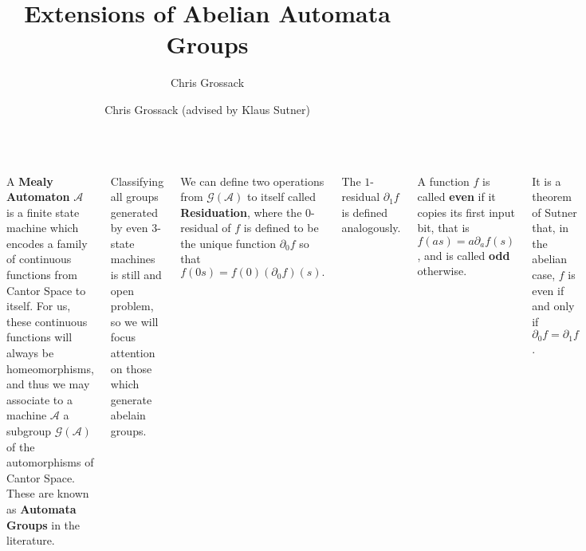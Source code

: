 \documentclass[24pt]{tikzposter}
\author{Chris Grossack}
\title{Extensions of Abelian Automata Groups}
\author{Chris Grossack (advised by Klaus Sutner)}
\institute{Carnegie Mellon University}
\theoremstyle{definition}
\newcommand{\Z}{\mathbb{Z}}
\newcommand{\del}{\partial}
\begin{document}
\maketitle

\begin{columns}
  {
    A \textbf{Mealy Automaton} $\mathcal{A}$ is a finite state 
    machine which encodes a family of continuous functions from 
    Cantor Space to itself. For us, these continuous functions 
    will always be homeomorphisms, and thus we may associate
    to a machine $\mathcal{A}$ a subgroup $\mathcal{G}(\mathcal{A})$
    of the automorphisms of Cantor Space. These are known as 
    \textbf{Automata Groups} in the literature.

    \bigskip

    Classifying all groups generated by even 3-state machines is still
    and open problem, so we will focus attention on those which generate
    abelain groups.

    \bigskip

    We can define two operations from $\mathcal{G}(\mathcal{A})$ to 
    itself called \textbf{Residuation}, where the $0$-residual
    of $f$ is defined to be the unique function $\del_0 f$ so that 
    \[ f(0s) = f(0) (\del_0 f)(s) .\]

    The $1$-residual $\del_1 f$ is defined analogously.

    \bigskip

    A function $f$ is called \textbf{even} if it copies its first input bit,
    that is $f(as) = a \del_a f(s)$, and is called \textbf{odd} otherwise.

    \bigskip

    It is a theorem of Sutner that, in the abelian case, $f$ is even 
    if and only if $\del_0 f = \del_1 f$.
  }

  {
    In their paper ``Automorphisms of the binary tree: 
    State-closed subgroups and dynamics of 1/2-endomorphisms'', 
    Nerkashevych and Sidki show that abelian automata groups are
    isomorphic to integer lattices, and moreover, there is a 
    ``1/2-integral'' matrix $\mathbf{A}_\mathcal{A}$ of irreducible character 
    so that residuation lifts to an affine map. Succinctly, for some $\varphi$:


    \[ \varphi : \mathcal{G}(\mathcal{A}) \cong \Z^m \]

    \[ 
      \varphi(\del_0 f) = 
      \begin{cases} 
        \mathbf{A} \varphi(f) & \text{$f$ even} \\
        \mathbf{A} (\varphi(f) - \overline{e}) & \text{$f$ odd}
      \end{cases}
    \]

}
\end{columns}
\end{document}
